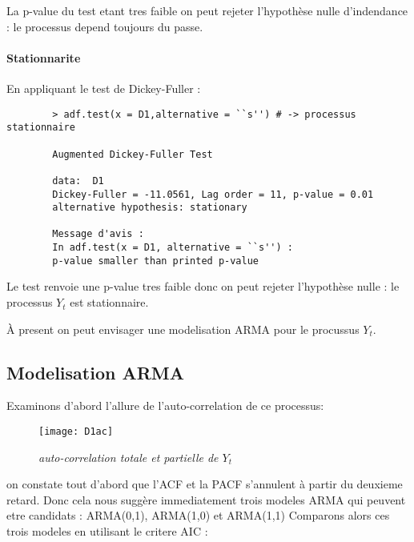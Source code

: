         La p-value du test etant tres faible on peut rejeter l'hypothèse nulle
        d'indendance : le processus depend toujours du passe.
        \paragraph{Stationnarite}
    
        En appliquant le test de Dickey-Fuller :
        \begin{verbatim}
        > adf.test(x = D1,alternative = ``s'') # -> processus stationnaire

        Augmented Dickey-Fuller Test

        data:  D1
        Dickey-Fuller = -11.0561, Lag order = 11, p-value = 0.01
        alternative hypothesis: stationary

        Message d'avis :
        In adf.test(x = D1, alternative = ``s'') :
        p-value smaller than printed p-value
        \end{verbatim}
        Le test renvoie une p-value tres faible donc on peut rejeter l'hypothèse
        nulle : le processus $Y_t$ est stationnaire.

        À present on peut envisager une modelisation ARMA pour le procussus
        $Y_t$.
    \subsection{Modelisation ARMA}        
        
        Examinons d'abord l'allure de l'auto-correlation de ce processus:
        \begin{figure}[H]
            \centering 
            \label{fig:D1ac} 
            \texttt{[image: D1ac]} 
            \caption{\it auto-correlation totale et partielle de $Y_t$ } 
        \end{figure} 

        on constate tout d'abord que l'ACF et la PACF s'annulent à partir du
        deuxieme
        retard. Donc cela nous suggère immediatement trois modeles ARMA qui peuvent
        etre candidats : ARMA(0,1), ARMA(1,0) et ARMA(1,1)
        Comparons alors ces trois modeles en utilisant le critere AIC :

